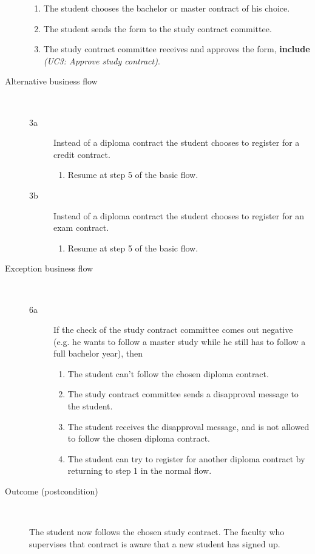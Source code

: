 \begin{description}
\begin{enumerate}
	  	\item The student chooses the bachelor or master contract of his choice.
	  	\item The student sends the form to the study contract committee.
	  	\item The study contract committee receives and approves the form,
	  	\textbf{include} \emph{(UC3: Approve study contract)}.
	\end{enumerate}
	\item[Alternative business flow] \ 
	\begin{description}
		\item[3a] Instead of a diploma contract the student chooses to register for a
		credit contract. 
		\begin{enumerate}
		  \item Resume at step 5 of the basic flow.
		\end{enumerate}
		\item[3b] Instead of a diploma contract the student chooses to register for an
		exam contract. 
		\begin{enumerate}
		  \item Resume at step 5 of the basic flow.
		\end{enumerate}
	\end{description}
	\item[Exception business flow] \ 
	\begin{description}
		\item[6a] If the check of the study contract committee comes out negative
		(e.g. he wants to follow a master study while he still has to follow a
		full bachelor year), then 
		\begin{enumerate}	
		  \item The student can't follow the chosen diploma contract.	
		  \item The study contract committee sends a disapproval message to the
		  student.
		  \item The student receives the disapproval message, and is not allowed to
		  follow the chosen diploma contract.
		  \item The student can try to register for another diploma contract by
		  returning to step 1 in the normal flow.
		\end{enumerate}
	\end{description}
	\item[Outcome (postcondition)] \
		\par The student now follows the chosen study contract. The faculty who
		supervises that contract is aware that a new student has signed up.
\end{description}
